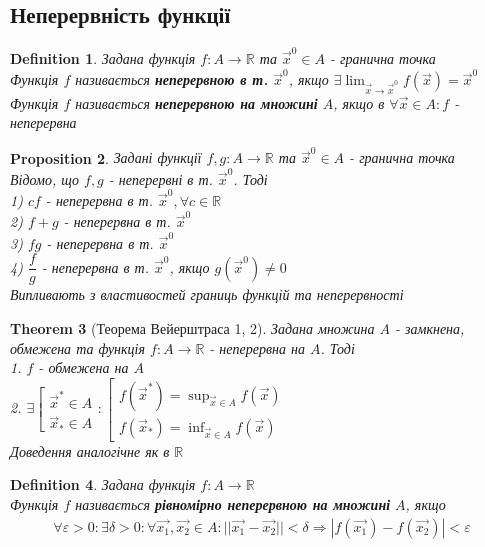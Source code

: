 \documentclass[a4paper, 14pt]{extarticle}
\def\huge{\displaystyle}
\theoremstyle{theoremdd}
\newtheorem{theorem}{Theorem}[subsection]
\theoremstyle{theoremdd}
\newtheorem{definition}[theorem]{Definition}
\theoremstyle{theoremdd}
\newtheorem{proposition}[theorem]{Proposition}
\theoremstyle{theoremdd}
\theoremstyle{theoremdd}
\theoremstyle{theoremdd}
\theoremstyle{theoremdd}
\begin{document}
\subsection{Неперервність функції}
\begin{definition}
Задана функція $f: A \to \mathbb{R}$ та $\vec{x}^0 \in A$ - гранична точка\\
Функція $f$ називається \textbf{неперервною в т.} $\vec{x}^0$, якщо $\exists \huge \lim_{\vec{x} \to \vec{x}^0} f(\vec{x}) = \vec{x}^0$\\
Функція $f$ називається \textbf{неперервною на множині} $A$, якщо в $\forall \vec{x} \in A: f$ - неперервна
\end{definition}

\begin{proposition}
Задані функції $f,g: A \to \mathbb{R}$ та $\vec{x}^0 \in A$ - гранична точка\\
Відомо, що $f,g$ - неперервні в т. $\vec{x}^0$. Тоді\\
1) $cf$ - неперервна в т. $\vec{x}^0, \forall c \in \mathbb{R}$\\
2) $f+g$ - неперервна в т. $\vec{x}^0$\\
3) $fg$ - неперервна в т. $\vec{x}^0$\\
4) $\dfrac{f}{g}$ - неперервна в т. $\vec{x}^0$, якщо $g(\vec{x}^0) \neq 0$\\
\textit{Випливають з властивостей границь функцій та неперервності}
\end{proposition}

\begin{theorem}[Теорема Вейерштраса 1, 2]
Задана множина $A$ - замкнена, обмежена та функція $f: A \to \mathbb{R}$ - неперервна на $A$. Тоді\\
1. $f$ - обмежена на $A$\\
2. $\exists \left[ \begin{gathered} \vec{x}^* \in A \\ \vec{x}_* \in A \end{gathered} \right. : \left[ \begin{gathered} f(\vec{x}^*) = \sup_{\vec{x} \in A} f(\vec{x}) \\ f(\vec{x}_*) = \inf_{\vec{x} \in A} f(\vec{x}) \end{gathered} \right.$\\
\textit{Доведення аналогічне як в $\mathbb{R}$}
\end{theorem}

\begin{definition}
Задана функція $f: A \to \mathbb{R}$\\
Функція $f$ називається \textbf{рівномірно неперервною на множині} $A$, якщо
\begin{align*}
\forall \varepsilon > 0: \exists \delta > 0: \forall \vec{x_1}, \vec{x_2} \in A: ||\vec{x_1} - \vec{x_2}|| < \delta \Rightarrow |f(\vec{x_1}) - f(\vec{x_2})| < \varepsilon 
\end{align*}
\end{definition}
\end{document}
